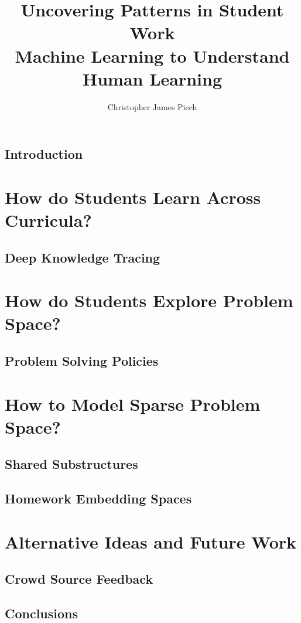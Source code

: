 \documentclass{report}
\begin{document}
\newcommand{\Chris}[1]{{\color{purple}{\bf\sf [Chris: #1]}}}

\title{Uncovering Patterns in Student Work\\
            Machine Learning to Understand Human Learning}
\author{Christopher James Piech}
 
\beforepreface
{}



\afterpreface

\chapter{Introduction}


\part{How do Students Learn Across Curricula?}

\chapter{Deep Knowledge Tracing}


\part{How do Students Explore Problem Space?}

\chapter{Problem Solving Policies}


\part{How to Model Sparse Problem Space?}

\chapter{Shared Substructures}


\chapter{Homework Embedding Spaces}


\part{Alternative Ideas and Future Work}

\chapter{Crowd Source Feedback}


\chapter{Conclusions}



 
\end{document}
